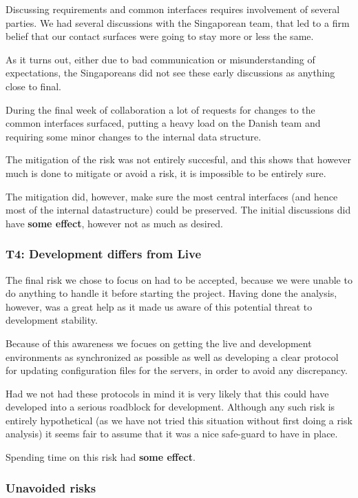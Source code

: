 Discussing requirements and common interfaces requires involvement of several parties. We had several
discussions with the Singaporean team, that led to a firm belief that our contact surfaces were going
to stay more or less the same.

As it turns out, either due to bad communication or misunderstanding of expectations, the Singaporeans
did not see these early discussions as anything close to final.

During the final week of collaboration a lot of requests for changes to the common interfaces surfaced,
putting a heavy load on the Danish team and requiring some minor changes to the internal data structure.

The mitigation of the risk was not entirely succesful, and this shows that however much is done to mitigate
or avoid a risk, it is impossible to be entirely sure.

The mitigation did, however, make sure the most central interfaces (and hence most of the internal datastructure)
could be preserved. The initial discussions did have \textbf{some effect}, however not as much as desired.

\subsubsection{T4: Development differs from Live}

The final risk we chose to focus on had to be accepted, because we were unable to do
anything to handle it before starting the project. Having done the analysis, however, was a great help
as it made us aware of this potential threat to development stability.

Because of this awareness we focues on getting the live and development environments as synchronized as
possible as well as developing a clear protocol for updating configuration files for the servers, in
order to avoid any discrepancy.

Had we not had these protocols in mind it is very likely that this could have developed into a serious
roadblock for development. Although any such risk is entirely hypothetical (as we have not tried this
situation without first doing a risk analysis) it seems fair to assume that it was a nice safe-guard to
have in place.

Spending time on this risk had \textbf{some effect}.

\subsubsection{Unavoided risks}

